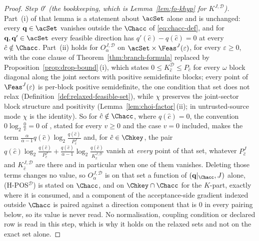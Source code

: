 \begin{proof}
\emph{Step 0$'$ (the bookkeeping, which is Lemma~\ref{lem:fo-khyp} for
$K^{J,\mathcal{D}}$).} Part~(i) of that lemma is a statement about $\acSet$
alone and is unchanged: every $\mathbf q\in\acSet$ vanishes outside the
 $\Chacc$ of \eqref{eq:chacc-def}, and for
$\mathbf q,\mathbf q'\in\acSet$ every feasible direction has
$q'(\hat c)-q(\hat c)=0$ at every $\hat c\notin\Chacc$. Part~(ii) holds for
$O^{J,\mathcal{D}}_{\alpha}$ on $\acSet\times\Feas^{J}(\varepsilon)$, for
every $\varepsilon\ge0$, with the cone clause of
Theorem~\ref{thm:branch-formula} replaced by
Proposition~\ref{prop:drop-bound}\,(i), which states
$0\le K^{\mathcal{D}}_{\hat c}\le P_{\hat c}$ for every $\omega$ block diagonal
along the joint sectors with positive semidefinite blocks; every point of
$\Feas^{J}(\varepsilon)$ is per-block positive semidefinite, the one
condition that set does not relax (Definition~\ref{def:relaxed-feasible-set}),
while $\chi$ preserves the joint-sector block structure and positivity
(Lemma~\ref{lem:choi-factor}\,(ii); in untrusted-source mode $\chi$ is the
identity). So for
$\hat c\notin\Chacc$, where $q(\hat c)=0$, the convention
$0\log_2\frac0v=0$ of , stated for every
$v\ge0$ and the case $v=0$ included, makes the term
$\frac{\alpha}{\alpha-1}q(\hat c)\log_2\frac{q(\hat c)}{P^{J}_{\hat c}}$ and,
for $\hat c\in\Chkey$, the pair
$q(\hat c)\log_2\frac{q(\hat c)}{P^{J}_{\hat c}}
+\frac{q(\hat c)}{\alpha-1}\log_2\frac{q(\hat c)}{K^{J,\mathcal{D}}_{\hat c}}$
vanish at \emph{every} point of that set, whatever $P^{J}_{\hat c}$ and
$K^{J,\mathcal{D}}_{\hat c}$ are there and in particular when one of them
vanishes. Deleting those terms changes no value, so
$O^{J,\mathcal{D}}_{\alpha}$ is on that set a function of
$(\mathbf q|_{\Chacc},J)$ alone, (H-POS$^{\mathcal{D}}$) is stated on
$\Chacc$, and on $\Chkey\cap\Chacc$ for the $K$-part, exactly where it is
consumed, and a component of the acceptance-side gradient indexed outside
$\Chacc$ is paired against a direction component that is $0$ in every pairing
below, so its value is never read. No normalisation, coupling condition
or declared row is read in this step, which is why it holds on the
relaxed sets and not on the exact set alone.


\end{proof}
